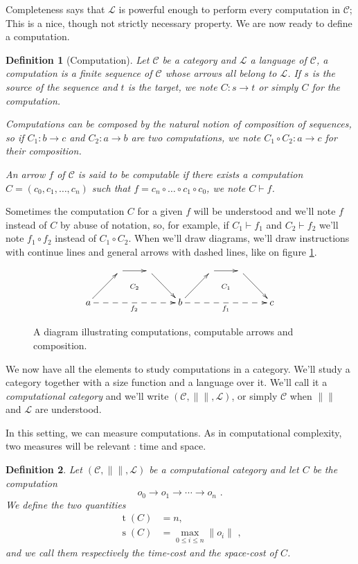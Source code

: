 \documentclass{article}
\newcommand{\cat}[1]{\mathscr{#1}}
\newcommand{\C}{\cat{C}}
\renewcommand{\L}{\cat{L}}
\newcommand{\comp}{\circ}
\newcommand{\size}[1]{\lVert#1\rVert}
\newcommand{\ra}{\rightarrow}
\DeclareMathOperator{\Time}{t}
\DeclareMathOperator{\Space}{s}
\newcommand{\computes}{\vdash}
\newtheorem{definition}{Definition}
\begin{document}
  Completeness says that $\L$ is powerful enough to perform every
  computation in $\C$; This is a nice, though not strictly necessary
  property. We are now ready to define a computation.

  \begin{definition}[Computation]
    Let $\C$ be a category and $\L$ a language of $\C$, a
    \emph{computation} is a finite sequence of $\C$ whose arrows all
    belong to $\L$. If $s$ is the source of the sequence and $t$ is
    the target, we note $C:s\ra t$ or simply $C$ for the
    computation.
    
    Computations can be composed by the natural notion of composition
    of sequences, so if $C_1 : b\ra c$ and $C_2 : a\ra b$ are two
    computations, we note $C_1\comp C_2 : a\ra c$ for their
    composition.

    An arrow $f$ of $\C$ is said to be \emph{computable} if there
    exists a computation $C = (c_0, c_1,\ldots,c_n)$ such that $f =
    c_n\comp\ldots\comp c_1\comp c_0$, we note $C\computes f$.
  \end{definition}

  Sometimes the computation $C$ for a given $f$ will be understood and
  we'll note $f$ instead of $C$ by abuse of notation, so, for example,
  if $C_1\computes f_1$ and $C_2\computes f_2$ we'll note $f_1\comp
  f_2$ instead of $C_1\comp C_2$. When we'll draw diagrams, we'll draw
  instructions with continue lines and general arrows with dashed
  lines, like on figure \ref{fig:comp}.
  \begin{figure}[!h]
    \[\xymatrix{
      & \ar[r]\ar@{}[dr]|{C_2} & \ar[dr] &
      & \ar[r]\ar@{}[dr]|{C_1} & \ar[dr] \\
      a \ar[ur]\ar@{-->}[rrr]_{f_2} &&& b
      \ar[ur]\ar@{-->}[rrr]_{f_1} &&& c
    }\]
    \caption{\label{fig:comp}A diagram illustrating computations,
    computable arrows and composition.}
  \end{figure}
  
  We now have all the elements to study computations in a
  category. We'll study a category together with a size function and a
  language over it. We'll call it a \emph{computational category} and
  we'll write $(\C, \size{}, \L)$, or simply $\C$ when $\size{}$ and
  $\L$ are understood.

  In this setting, we can measure computations. As in computational
  complexity, two measures will be relevant : time and space.

  \begin{definition}
    Let $(\C, \size{}, \L)$ be a computational category and let $C$ be
    the computation
    \[o_0 \ra o_1 \ra \cdots \ra o_n \text{ .}\]
    We define the two quantities
    \begin{align*}
      \Time(C) &= n \text{,} \\
      \Space(C) &= \max_{0\le i \le n} \size{o_i} \text{ ,}
    \end{align*}
    and we call them respectively the \emph{time-cost} and the
    \emph{space-cost} of $C$.
  \end{definition}
\end{document}
